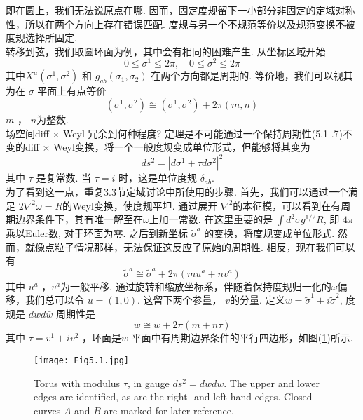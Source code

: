 即在圆上，我们无法说原点在哪. 因而，固定度规留下一小部分非固定的定域对称性，所以在两个方向上存在错误匹配. 度规与另一个不规范等价以及规范变换不被度规选择所固定.\\
转移到弦，我们取圆环面为例，其中会有相同的困难产生. 从坐标区域开始
\begin{equation}
	0 \leq \sigma^{1} \leq 2 \pi, \quad 0 \leq \sigma^{2} \leq 2 \pi
\end{equation}
其中$X^{\mu}\left(\sigma^{1}, \sigma^{2}\right)$ 和 $g_{a b}\left(\sigma_{1}, \sigma_{2}\right)$ 在两个方向都是周期的. 等价地，我们可以视其为在 $\sigma$ 平面上有点等价
\begin{equation}
	\left(\sigma^{1}, \sigma^{2}\right) \cong\left(\sigma^{1}, \sigma^{2}\right)+2 \pi(m, n)
\end{equation}
 $m$ ， $n$为整数.\\
场空间diff $\times$ Weyl 冗余到何种程度? 定理是不可能通过一个保持周期性(5.1 .7)不变的diff $\times$ Weyl变换，将一个一般度规变成单位形式，但能够将其变为
\begin{equation}
	d s^{2}=\left|d \sigma^{1}+\tau d \sigma^{2}\right|^{2}
\end{equation}
其中 $\tau$ 是复常数. 当 $\tau=i$ 时，这是单位度规 $\delta_{a b}$.\\
为了看到这一点，重复3.3节定域讨论中所使用的步骤.  首先，我们可以通过一个满足 $2 \nabla^{2} \omega=R $的Weyl变换，使度规平坦.  通过展开 $\nabla^{2}$的本征模，可以看到在有周期边界条件下，其有唯一解至在$\omega $上加一常数.  在这里重要的是 $\int d^{2} \sigma g^{1 / 2} R$, 即 $4 \pi$ 乘以Euler数, 对于环面为零. 之后到新坐标 $\tilde{\sigma}^{a}$ 的变换，将度规变成单位形式. 然而，就像点粒子情况那样，无法保证这反应了原始的周期性. 相反，现在我们可以有
\begin{equation}
	\tilde{\sigma}^{a} \cong \tilde{\sigma}^{a}+2 \pi\left(m u^{a}+n v^{a}\right)
\end{equation}
其中 $u^{a}$ ，$v^{a} $为一般平移. 通过旋转和缩放坐标系，伴随着保持度规归一化的$\omega$偏移，我们总可以令 $u=(1,0)$. 这留下两个参量， $v$的分量. 定义$w=\tilde{\sigma}^{1}+i \tilde{\sigma}^{2}$, 度规是 $d w d \bar{w}$ 周期性是
\begin{equation}
	w \cong w+2 \pi(m+n \tau)
\end{equation}
其中 $\tau=v^{1}+i v^{2} $ ，环面是$w$ 平面中有周期边界条件的平行四边形，如图(\ref{Fig5.1})所示.

\begin{figure}
	\begin{center}
		\texttt{[image: Fig5.1.jpg]}\\
		\caption{Torus with modulus $\tau$, in gauge $d s^{2}=d w d \bar{w}$. The upper and lower edges are identified, as are the right- and left-hand edges. Closed curves $A$ and $B$ are marked for later reference.}\label{Fig5.1}
	\end{center}
\end{figure}


